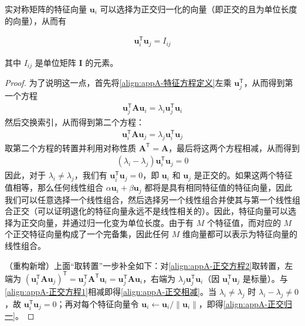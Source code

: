 \documentclass[../main.tex]{subfiles}
\begin{document}
实对称矩阵的特征向量 $\bm{u}_i$ 可以选择为正交归一化的向量（即正交的且为单位长度的向量），从而有
\begin{proposition}[特征向量的正交归一性]\label{proposition:appA-特征向量正交}
\begin{align}
  \bm{u}_i^{\mathsf{T}}\bm{u}_j=I_{ij}
  \label{align:appA-正交归一}
\end{align}
\end{proposition}

其中 $I_{ij}$ 是单位矩阵 $\bm{I}$ 的元素。

\begin{proof}
为了说明这一点，首先将\eqref{align:appA-特征方程定义}左乘 $\bm{u}_j^{\mathsf{T}}$，从而得到第一个方程
\begin{align}
  \bm{u}_j^{\mathsf{T}}\bm{A}\bm{u}_i=\lambda_i\bm{u}_j^{\mathsf{T}}\bm{u}_i
  \label{align:appA-正交方程1}
\end{align}
然后交换索引，从而得到第二个方程：
\begin{align}
  \bm{u}_i^{\mathsf{T}}\bm{A}\bm{u}_j=\lambda_j\bm{u}_i^{\mathsf{T}}\bm{u}_j
  \label{align:appA-正交方程2}
\end{align}
取第二个方程的转置并利用对称性质 $\bm{A}^{\mathsf{T}}=\bm{A}$，最后将这两个方程相减，从而得到
\begin{align}
  (\lambda_i-\lambda_j)\bm{u}_i^{\mathsf{T}}\bm{u}_j=0
  \label{align:appA-正交相减}
\end{align}
因此，对于 $\lambda_i\neq\lambda_j$，我们有 $\bm{u}_i^{\mathsf{T}}\bm{u}_j=0$，即 $\bm{u}_i$ 和 $\bm{u}_j$ 是正交的。如果这两个特征值相等，那么任何线性组合 $\alpha\bm{u}_i+\beta\bm{u}_j$ 都将是具有相同特征值的特征向量，因此我们可以任意选择一个线性组合，然后选择另一个线性组合并使其与第一个线性组合正交（可以证明退化的特征向量永远不是线性相关的）。因此，特征向量可以选择为正交向量，并通过归一化变为单位长度。由于有 $M$ 个特征值，而对应的 $M$ 个正交特征向量构成了一个完备集，因此任何 $M$ 维向量都可以表示为特征向量的线性组合。

（重构新增）上面“取转置”一步补全如下：对\eqref{align:appA-正交方程2}取转置，左端为 $(\bm{u}_i^{\mathsf{T}}\bm{A}\bm{u}_j)^{\mathsf{T}}=\bm{u}_j^{\mathsf{T}}\bm{A}^{\mathsf{T}}\bm{u}_i=\bm{u}_j^{\mathsf{T}}\bm{A}\bm{u}_i$，右端为 $\lambda_j\bm{u}_j^{\mathsf{T}}\bm{u}_i$（因 $\bm{u}_i^{\mathsf{T}}\bm{u}_j$ 是标量）。与\eqref{align:appA-正交方程1}相减即得\eqref{align:appA-正交相减}。当 $\lambda_i\neq\lambda_j$ 时 $\lambda_i-\lambda_j\neq0$，故 $\bm{u}_i^{\mathsf{T}}\bm{u}_j=0$；再对每个特征向量令 $\bm{u}_i\leftarrow\bm{u}_i/\|\bm{u}_i\|$，即得\eqref{align:appA-正交归一}。
\end{proof}
\end{document}
